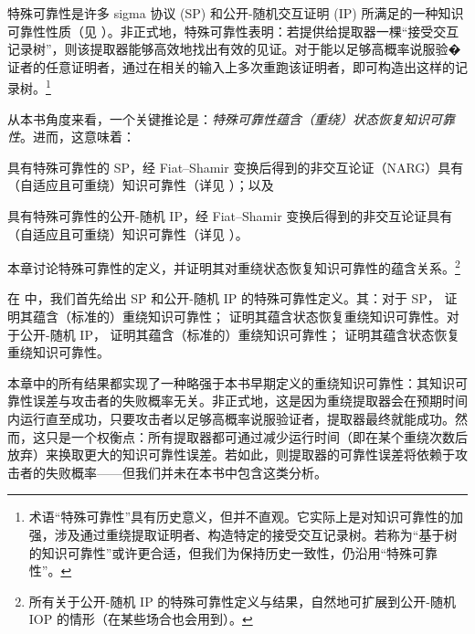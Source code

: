 \documentclass[american,singlepageview]{snargs-book-zh}
\begin{document}
特殊可靠性是许多 sigma 协议 (SP) 和公开-随机交互证明 (IP) 所满足的一种知识可靠性性质（见 ）。非正式地，特殊可靠性表明：若提供给提取器一棵“接受交互记录树”，则该提取器能够高效地找出有效的见证。对于能以足够高概率说服验�证者的任意证明者，通过在相关的输入上多次重跑该证明者，即可构造出这样的记录树。\footnote{术语“特殊可靠性”具有历史意义，但并不直观。它实际上是对知识可靠性的加强，涉及通过重绕提取证明者、构造特定的接受交互记录树。若称为“基于树的知识可靠性”或许更合适，但我们为保持历史一致性，仍沿用“特殊可靠性”。}

从本书角度来看，一个关键推论是：\emph{特殊可靠性蕴含（重绕）状态恢复知识可靠性}。进而，这意味着：
\begin{inparaenum}[(i)]
  \item 具有特殊可靠性的 SP，经 Fiat–Shamir 变换后得到的非交互论证（NARG）具有（自适应且可重绕）知识可靠性（详见 ）；以及
  \item 具有特殊可靠性的公开-随机 IP，经 Fiat–Shamir 变换后得到的非交互论证具有（自适应且可重绕）知识可靠性（详见 ）。
\end{inparaenum}

本章讨论特殊可靠性的定义，并证明其对重绕状态恢复知识可靠性的蕴含关系。\footnote{所有关于公开-随机 IP 的特殊可靠性定义与结果，自然地可扩展到公开-随机 IOP 的情形（在某些场合也会用到）。}

在  中，我们首先给出 SP 和公开-随机 IP 的特殊可靠性定义。其：对于 SP， 证明其蕴含（标准的）重绕知识可靠性； 证明其蕴含状态恢复重绕知识可靠性。对于公开-随机 IP， 证明其蕴含（标准的）重绕知识可靠性； 证明其蕴含状态恢复重绕知识可靠性。

\begin{remark}[提取权衡]
\label{remark:rewinding-extractor-with-no-dependence-on-failure}
本章中的所有结果都实现了一种略强于本书早期定义的重绕知识可靠性：其知识可靠性误差与攻击者的失败概率无关。非正式地，这是因为重绕提取器会在预期时间内运行直至成功，只要攻击者以足够高概率说服验证者，提取器最终就能成功。然而，这只是一个权衡点：所有提取器都可通过减少运行时间（即在某个重绕次数后放弃）来换取更大的知识可靠性误差。若如此，则提取器的可靠性误差将依赖于攻击者的失败概率——但我们并未在本书中包含这类分析。
\end{remark}
\end{document}
